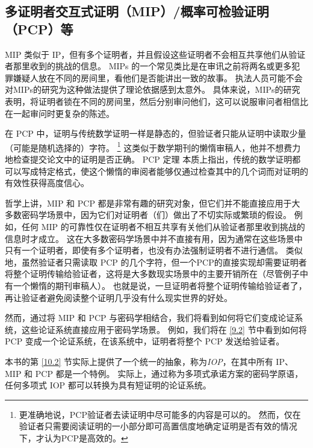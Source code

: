 \subsection{多证明者交互式证明（MIP）/概率可检验证明（PCP）等}
MIP 类似于 IP，但有多个证明者，并且假设这些证明者不会相互共享他们从验证者那里收到的挑战的信息。 MIPs 的一个常见类比是在审讯之前将两名或更多犯罪嫌疑人放在不同的房间里，看他们是否能讲出一致的故事。 
执法人员可能不会对MIPs的研究为这种做法提供了理论依据感到太意外。
具体来说，MIPs的研究表明，将证明者锁在不同的房间里，然后分别审问他们，这可以说服审问者相信比在一起审问时更复杂的陈述。


在 PCP 中，证明与传统数学证明一样是静态的，但验证者只能从证明中读取少量（可能是随机选择的）字符。 \footnote{更准确地说，PCP验证者去读证明中尽可能多的内容是可以的。 然而，仅在验证者只需要阅读证明的一小部分即可高置信度地确定证明是否有效的情况下，才认为PCP是高效的。} 这类似于数学期刊的懒惰审稿人，他并不想费力地检查提交论文中的证明是否正确。 
PCP 定理 \cite{ALM+98,AS98}本质上指出，传统的数学证明都可以写成特定格式，使这个懒惰的审阅者能够仅通过检查其中的几个词而对证明的有效性获得高度信心。

哲学上讲，MIP 和 PCP 都是非常有趣的研究对象，但它们并不能直接应用于大多数密码学场景中，因为它们对证明者（们）做出了不切实际或繁琐的假设。 
例如，任何 MIP 的可靠性仅在证明者不相互共享有关他们从验证者那里收到挑战的信息时才成立。 这在大多数密码学场景中并不直接有用，因为通常在这些场景中只有一个证明者，即使有多个证明者，也没有办法强制证明者不进行通信。 
类似地，虽然验证者只需读取 PCP 的几个字符，但一个PCP的直接实现却需要证明者将整个证明传输给验证者，这将是大多数现实场景中的主要开销所在（尽管例子中有一个懒惰的期刊审稿人）。 也就是说，一旦证明者将整个证明传输给验证者了，再让验证者避免阅读整个证明几乎没有什么现实世界的好处。

然而，通过将 MIP 和 PCP 与密码学相结合，我们将看到如何将它们变成论证系统，这些论证系统直接应用于密码学场景。 例如，我们将在 \ref{9.2} 节中看到如何将 PCP 变成一个论证系统，在该系统中，证明者将整个 PCP 发送给验证者。

本书的第 \ref{10.2} 节实际上提供了一个统一的抽象，称为\emph{IOP}，在其中所有 IP、MIP 和 PCP 都是一个特例。 实际上，通过称为多项式承诺方案的密码学原语，任何多项式 IOP 都可以转换为具有短证明的论证系统。